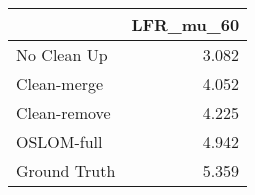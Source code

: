 \begin{tabular}{lr}
\toprule
{} & LFR_mu_60 \\
\midrule
No Clean Up  &     3.082 \\
Clean-merge  &     4.052 \\
Clean-remove &     4.225 \\
OSLOM-full   &     4.942 \\
Ground Truth &     5.359 \\
\bottomrule
\end{tabular}

